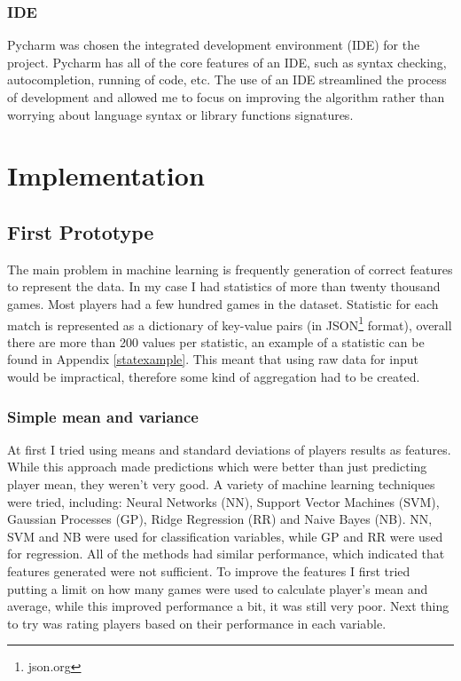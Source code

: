 \documentclass[12pt,a4paper]{book}
\begin{document}
\subsection{IDE}
Pycharm was chosen the integrated development environment (IDE) for the project.
Pycharm has all of the core features of an IDE, such as syntax checking, autocompletion, running of code, etc.
The use of an IDE streamlined the process of development and allowed me to focus on improving the algorithm rather than worrying about language syntax or library functions signatures. 

\chapter{Implementation}
\section{First Prototype}
The main problem in machine learning is frequently generation of correct features to represent the data.
In my case I had statistics of more than twenty thousand games.
Most players had a few hundred games in the dataset.
Statistic for each match is represented as a dictionary of key-value pairs (in JSON\footnote{json.org} format), overall there are more than 200 values per statistic, an example of a statistic can be found in Appendix \ref{statexample}.
This meant that using raw data for input would be impractical, therefore some kind of aggregation had to be created.

\subsection{Simple mean and variance}
At first I tried using means and standard deviations of players results as features.
While this approach made predictions which were better than just predicting player mean, they weren't very good.
A variety of machine learning techniques were tried, including: Neural Networks (NN), Support Vector Machines (SVM), Gaussian Processes (GP), Ridge Regression (RR) and Naive Bayes (NB).
NN, SVM and NB were used for classification variables, while GP and RR were used for regression.
All of the methods had similar performance, which indicated that features generated were not sufficient.
To improve the features I first tried putting a limit on how many games were used to calculate player's mean and average, while this improved performance a bit, it was still very poor.
Next thing to try was rating players based on their performance in each variable.
\end{document}
